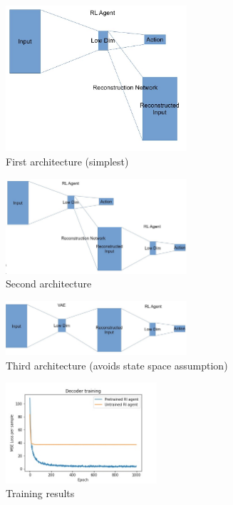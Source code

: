 \documentclass[a4paper]{scrartcl}
\begin{document}
\begin{figure}[H]
    \centering
    \includegraphics[width=0.6\textwidth]{Arch1.JPG}
    \caption{First architecture (simplest)}
    \label{fig:arch1}
\end{figure}
\begin{figure}[H]
    \centering
    \includegraphics[width=0.6\textwidth]{Arch2.JPG}
    \caption{Second architecture}
    \label{fig:arch2}
\end{figure}
\begin{figure}[H]
    \centering
    \includegraphics[width=0.6\textwidth]{Arch3.JPG}
    \caption{Third architecture (avoids state space assumption)}
    \label{fig:arch3}
\end{figure}


  \begin{figure}[H]
    \centering
    \includegraphics[width=0.5\textwidth]{training_results.jpg}
    \caption{Training results}
    \label{fig:train_results}
\end{figure}
\end{document}
